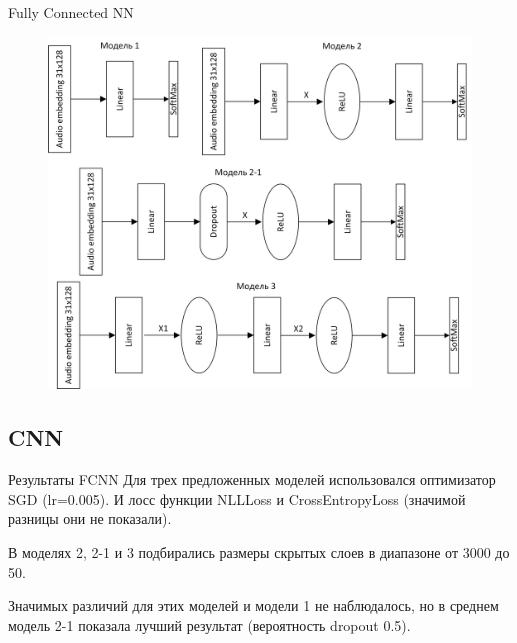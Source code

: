 \documentclass[c, aspectratio = 43]{beamer}
\begin{document}
    \begin{frame}{Fully Connected NN}
        \begin{figure}[h]
            \includegraphics[scale=0.4]{FCNN.png}
        \end{figure}

    \end{frame}

    \subsection{CNN}

    \begin{frame}{Результаты  FCNN}
        Для трех предложенных моделей использовался оптимизатор SGD (lr=0.005). И лосс функции NLLLoss и CrossEntropyLoss (значимой разницы они не показали).
        \vspace{0.5cm}

        В моделях 2, 2-1 и 3 подбирались размеры скрытых слоев в диапазоне от 3000 до 50.
        \vspace{0.5cm}

        Значимых различий для этих моделей и модели 1 не наблюдалось, но в среднем модель 2-1 показала лучший результат (вероятность dropout 0.5).

    \end{frame}
\end{document}
